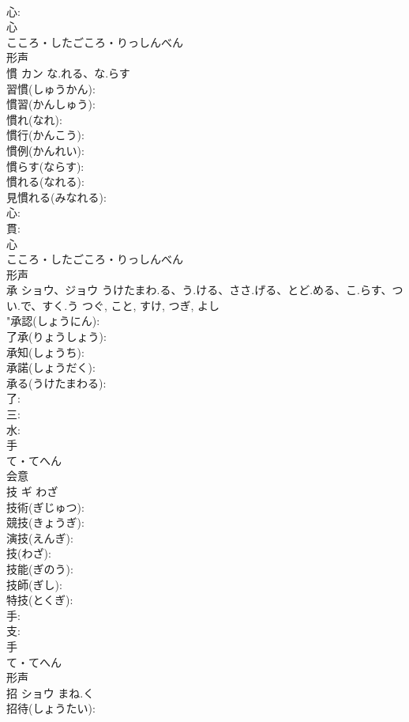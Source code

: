 \documentclass[8pt]{extreport}
\begin{document}
\begin{CJK}{UTF8}{min}
\\	心: 
\\	心	
\\	こころ・したごころ・りっしんべん	
\\	形声 
\\	慣	カン	な.れる、な.らす		
\\	習慣(しゅうかん): 
\\	慣習(かんしゅう): 
\\	慣れ(なれ): 
\\	慣行(かんこう): 
\\	慣例(かんれい): 
\\	慣らす(ならす): 
\\	慣れる(なれる): 
\\	見慣れる(みなれる): 
\\	心: 
\\	貫: 
\\	心	
\\	こころ・したごころ・りっしんべん	
\\	形声 
\\	承	ショウ、ジョウ	うけたまわ.る、う.ける、ささ.げる、とど.める、こ.らす、つい.で、すく.う	つぐ, こと, すけ, つぎ, よし	
\\	"承認(しょうにん): 
\\	了承(りょうしょう): 
\\	承知(しょうち): 
\\	承諾(しょうだく): 
\\	承る(うけたまわる): 
\\	了: 
\\	三: 
\\	水: 
\\	手	
\\	て・てへん	
\\	会意 
\\	技	ギ	わざ		
\\	技術(ぎじゅつ): 
\\	競技(きょうぎ): 
\\	演技(えんぎ): 
\\	技(わざ): 
\\	技能(ぎのう): 
\\	技師(ぎし): 
\\	特技(とくぎ): 
\\	手: 
\\	支: 
\\	手	
\\	て・てへん	
\\	形声 
\\	招	ショウ	まね.く		
\\	招待(しょうたい): 

\end{CJK}
\end{document}
